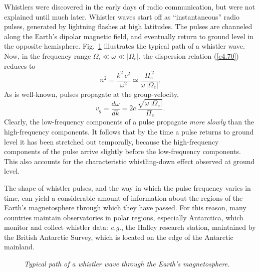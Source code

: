 Whistlers were discovered in the early days of radio communication, but
were not explained until much later. Whistler waves start off as ``instantaneous''
 radio
pulses, generated by lightning flashes at high latitudes. The pulses are
channeled along the Earth's dipolar magnetic field, and eventually return
to ground level in the opposite hemisphere. Fig.~\ref{f14} illustrates the typical
path of a whistler wave. Now, in the frequency
range ${\Omega}_i\ll \omega\ll |{\Omega}_e|$, the dispersion
relation (\ref{e4.70}) reduces to
\begin{equation}
n^2 = \frac{k^2\,c^2}{\omega^2}\simeq \frac{{\Pi}_e^{~2}}
{\omega\,|{\Omega}_e|}.
\end{equation}
As is well-known, pulses propagate  at the group-velocity,
\begin{equation}
v_g = \frac{d\omega}{dk} = 2c\,\frac{\sqrt{\omega\,|{\Omega}_e|}}{{\Pi}_e}.
\end{equation}
Clearly, the low-frequency components of a pulse propagate {\em more slowly}\/
than the high-frequency components. It follows that by the time a
pulse returns to ground level it has been stretched out temporally, because the
high-frequency components of the pulse arrive slightly before the low-frequency components. This also accounts for the characteristic whistling-down effect observed at
ground level.

The shape of whistler pulses, and the way in which 
the pulse frequency varies in time,
can yield a considerable amount of information about the regions of the Earth's
magnetosphere through which they have passed. For this reason, many
countries maintain observatories in polar regions, especially Antarctica, 
which monitor and collect
 whistler data: {\em e.g.}, the Halley research station, maintained
by the British Antarctic Survey, which is  located on the edge of
the  Antarctic mainland. 

\begin{figure}
\epsfysize=2.5in
\centerline{}
\caption{\em Typical path of a whistler wave through the Earth's magnetosphere.}\label{f14}
\end{figure}

